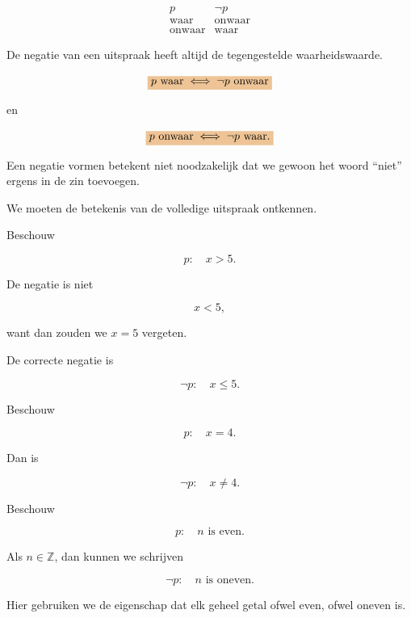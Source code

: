 \documentclass{ximera}
\begin{document}
  \[
  \begin{array}{c|c}
  p & \neg p\\
  \hline
  \text{waar} & \text{onwaar}\\
  \text{onwaar} & \text{waar}
  \end{array}
  \]


  \begin{opmerking}
  De negatie van een uitspraak heeft altijd de tegengestelde
  waarheidswaarde.

  \[
  \important{
  p\text{ waar}
  \iff
  \neg p\text{ onwaar}
  }
  \]

  en

  \[
  \important{
  p\text{ onwaar}
  \iff
  \neg p\text{ waar}.
  }
  \]
  \end{opmerking}



  Een negatie vormen betekent niet noodzakelijk dat we gewoon het woord
  ``niet'' ergens in de zin toevoegen.

  We moeten de betekenis van de volledige uitspraak ontkennen.


  \begin{voorbeeld}

  Beschouw

  \[
  p:\quad x>5.
  \]

  De negatie is niet

  \[
  x<5,
  \]

  want dan zouden we $x=5$ vergeten.

  De correcte negatie is

  \[
  \neg p:\quad x\leq5.
  \]
  \end{voorbeeld}


  \begin{voorbeeld}

  Beschouw

  \[
  p:\quad x=4.
  \]

  Dan is

  \[
  \neg p:\quad x\neq4.
  \]
  \end{voorbeeld}


  \begin{voorbeeld}

  Beschouw

  \[
  p:\quad n\text{ is even}.
  \]

  Als $n\in\mathbb{Z}$, dan kunnen we schrijven

  \[
  \neg p:\quad n\text{ is oneven}.
  \]

  Hier gebruiken we de eigenschap dat elk geheel getal ofwel even,
  ofwel oneven is.
  \end{voorbeeld}
\end{document}
